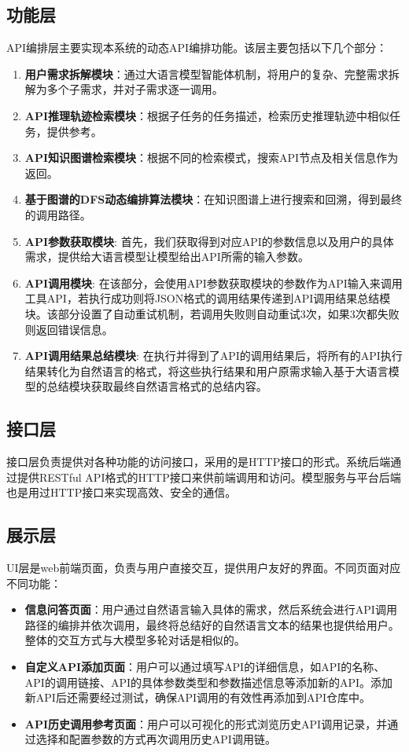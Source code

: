 \subsection{功能层}
API编排层主要实现本系统的动态API编排功能。该层主要包括以下几个部分：
\begin{enumerate}
    \item \textbf{用户需求拆解模块}：通过大语言模型智能体机制，将用户的复杂、完整需求拆解为多个子需求，并对子需求逐一调用。
    \item \textbf{API推理轨迹检索模块}：根据子任务的任务描述，检索历史推理轨迹中相似任务，提供参考。
    \item \textbf{API知识图谱检索模块}：根据不同的检索模式，搜索API节点及相关信息作为返回。
    \item \textbf{基于图谱的DFS动态编排算法模块}：在知识图谱上进行搜索和回溯，得到最终的调用路径。
    \item \textbf{API参数获取模块}: 首先，我们获取得到对应API的参数信息以及用户的具体需求，提供给大语言模型让模型给出API所需的输入参数。
    \item \textbf{API调用模块}: 在该部分，会使用API参数获取模块的参数作为API输入来调用工具API，若执行成功则将JSON格式的调用结果传递到API调用结果总结模块。该部分设置了自动重试机制，若调用失败则自动重试3次，如果3次都失败则返回错误信息。
    \item \textbf{API调用结果总结模块}: 在执行并得到了API的调用结果后，将所有的API执行结果转化为自然语言的格式，将这些执行结果和用户原需求输入基于大语言模型的总结模块获取最终自然语言格式的总结内容。
\end{enumerate}

\subsection{接口层}

接口层负责提供对各种功能的访问接口，采用的是HTTP接口的形式。系统后端通过提供RESTful API格式的HTTP接口来供前端调用和访问。模型服务与平台后端也是用过HTTP接口来实现高效、安全的通信。

\subsection{展示层}
UI层是web前端页面，负责与用户直接交互，提供用户友好的界面。不同页面对应不同功能：
\begin{itemize}
    \item \textbf{信息问答页面}：用户通过自然语言输入具体的需求，然后系统会进行API调用路径的编排并依次调用，最终将总结好的自然语言文本的结果也提供给用户。整体的交互方式与大模型多轮对话是相似的。
    \item \textbf{自定义API添加页面}：用户可以通过填写API的详细信息，如API的名称、API的调用链接、API的具体参数类型和参数描述信息等添加新的API。添加新API后还需要经过测试，确保API调用的有效性再添加到API仓库中。
    \item \textbf{API历史调用参考页面}：用户可以可视化的形式浏览历史API调用记录，并通过选择和配置参数的方式再次调用历史API调用链。
\end{itemize}


